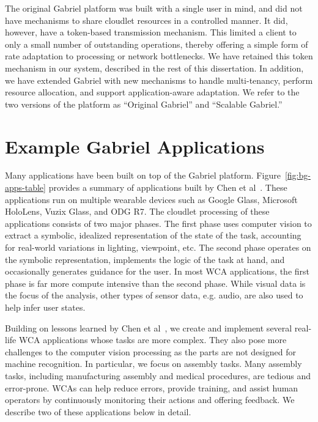 The original Gabriel platform was built with a single user in mind, and did not
have mechanisms to share cloudlet resources in a controlled manner.  It did,
however, have a token-based transmission mechanism.  This limited a client to
only a small number of outstanding operations, thereby offering a simple form of
rate adaptation to processing or network bottlenecks.  We have retained this
token mechanism in our system, described in the rest of this dissertation. In
addition, we have extended Gabriel with new mechanisms to handle multi-tenancy,
perform resource allocation, and support application-aware adaptation.  We refer
to the two versions of the platform as ``Original Gabriel'' and ``Scalable
Gabriel.''

\section{Example Gabriel Applications}
\label{sec:example-apps}

Many applications have been built on top of the Gabriel platform.
Figure~\ref{fig:bg-apps-table} provides a summary of applications built by Chen
et al~\cite{chen2018application}. These applications run on multiple wearable
devices such as Google Glass, Microsoft HoloLens, Vuzix Glass, and ODG R7. The
cloudlet processing of these applications consists of two major phases. The
first phase uses computer vision to extract a symbolic, idealized representation
of the state of the task, accounting for real-world variations in lighting,
viewpoint, etc.  The second phase operates on the symbolic representation,
implements the logic of the task at hand, and occasionally generates guidance
for the user.  In most WCA applications, the first phase is far more compute
intensive than the second phase. While visual data is the focus of the analysis,
other types of sensor data, e.g. audio, are also used to help infer user states.

Building on lessons learned by Chen et al~\cite{chen2018application}, we create
and implement several real-life WCA applications whose tasks are more complex.
They also pose more challenges to the computer vision processing as the parts
are not designed for machine recognition. In particular, we focus on assembly
tasks. Many assembly tasks, including manufacturing assembly and medical
procedures, are tedious and error-prone. WCAs can help reduce errors, provide
training, and assist human operators by continuously monitoring their actions
and offering feedback. We describe two of these applications below in detail.

